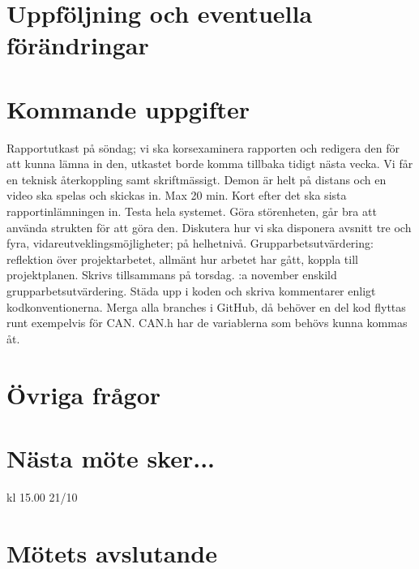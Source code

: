 \documentclass{article}
\begin{document}
\section{Uppföljning och eventuella förändringar} 

\section{Kommande uppgifter}
Rapportutkast på söndag; vi ska korsexaminera rapporten och redigera den för att kunna lämna in den, utkastet borde komma tillbaka tidigt nästa vecka. Vi får en teknisk återkoppling samt skriftmässigt.
\newline\newline
Demon är helt på distans och en video ska spelas och skickas in. Max 20 min.
Kort efter det ska sista rapportinlämningen in.
\newline\newline
Testa hela systemet.
\newline\newline
Göra störenheten, går bra att använda strukten för att göra den.
\newline\newline
Diskutera hur vi ska disponera avsnitt tre och fyra, vidareutveklingsmöjligheter; på helhetnivå.
\newline\newline
Grupparbetsutvärdering: reflektion över projektarbetet, allmänt hur arbetet har gått, koppla till projektplanen. Skrivs tillsammans på torsdag.
\newline{}:a november enskild grupparbetsutvärdering.
\newline\newline
Städa upp i koden och skriva kommentarer enligt kodkonventionerna.
\newline\newline
Merga alla branches i GitHub, då behöver en del kod flyttas runt exempelvis för CAN.  CAN.h har de variablerna som behövs kunna kommas åt.


\section{Övriga frågor} 

\section{Nästa möte sker...} 

kl 15.00 21/10

\section{Mötets avslutande} 
\end{document}
